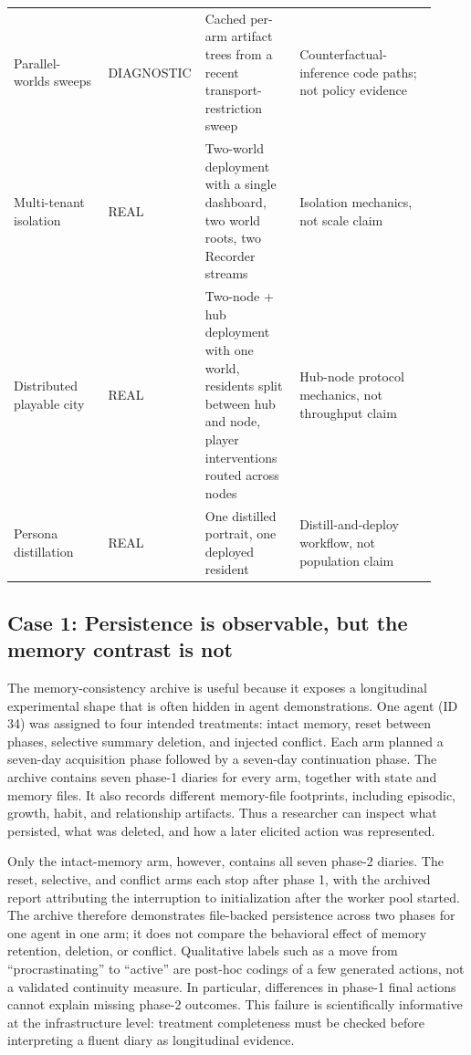 \begin{table}[t]
\begin{tabular}{@{}p{0.22\linewidth}p{0.16\linewidth}p{0.22\linewidth}p{0.32\linewidth}@{}}
Parallel-worlds sweeps & \textsf{DIAGNOSTIC} & Cached per-arm artifact trees from a recent transport-restriction sweep & Counterfactual-inference code paths; not policy evidence \\
Multi-tenant isolation & \textsf{REAL} & Two-world deployment with a single dashboard, two world roots, two Recorder streams & Isolation mechanics, not scale claim \\
Distributed playable city & \textsf{REAL} & Two-node + hub deployment with one world, residents split between hub and node, player interventions routed across nodes & Hub-node protocol mechanics, not throughput claim \\
Persona distillation & \textsf{REAL} & One distilled portrait, one deployed resident & Distill-and-deploy workflow, not population claim \\
\bottomrule
\end{tabular}
\end{table}

\subsection{Case 1: Persistence is observable, but the memory contrast is not}

The memory-consistency archive is useful because it exposes a longitudinal
experimental shape that is often hidden in agent demonstrations.  One agent
(ID 34) was assigned to four intended treatments: intact memory, reset
between phases, selective summary deletion, and injected conflict.  Each
arm planned a seven-day acquisition phase followed by a seven-day
continuation phase.  The archive contains seven phase-1 diaries for every
arm, together with state and memory files.  It also records different
memory-file footprints, including episodic, growth, habit, and
relationship artifacts.  Thus a researcher can inspect what persisted, what
was deleted, and how a later elicited action was represented.

Only the intact-memory arm, however, contains all seven phase-2 diaries.
The reset, selective, and conflict arms each stop after phase 1, with the
archived report attributing the interruption to initialization after the
worker pool started.  The archive therefore demonstrates file-backed
persistence across two phases for one agent in one arm; it does not
compare the behavioral effect of memory retention, deletion, or conflict.
Qualitative labels such as a move from ``procrastinating'' to ``active''
are post-hoc codings of a few generated actions, not a validated
continuity measure.  In particular, differences in phase-1 final actions
cannot explain missing phase-2 outcomes.  This failure is scientifically
informative at the infrastructure level: treatment completeness must be
checked before interpreting a fluent diary as longitudinal evidence.

